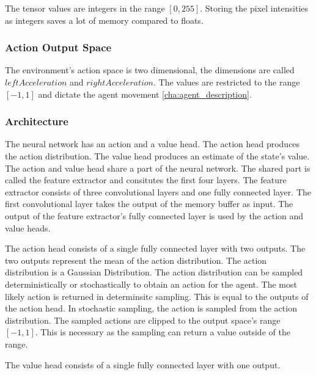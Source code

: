The tensor values are integers in the range $[0,255]$. Storing the pixel intensities as integers saves a lot of memory compared to floats.


\subsubsection{Action Output Space}

The environment's action space is two dimensional, the dimensions are called $leftAcceleration$ and $rightAcceleration$. The values are restricted to the range $[-1,1]$ and dictate the agent movement \ref*{cha:agent_description}.

\subsubsection{Architecture}
\label{sec:network_architecture}

The neural network has an action and a value head. The action head produces the action distribution. The value head produces an estimate of the state's value. The action and value head share a part of the neural network. The shared part is called the feature extractor and consitutes the first four layers. The feature extractor consists of three convolutional layers and one fully connected layer. The first convolutional layer takes the output of the memory buffer as input. The output of the feature extractor's fully connected layer is used by the action and value heads.

The action head consists of a single fully connected layer with two outputs. The two outputs represent the mean of the action distribution. The action distribution is a Gaussian Distribution. The action distribution can be sampled deterministically or stochastically to obtain an action for the agent. The most likely action is returned in determinsitc sampling. This is equal to the outputs of the action head. In stochastic sampling, the action is sampled from the action distribution.
The sampled actions are clipped to the output space's range $[-1,1]$. This is necessary as the sampling can return a value outside of the range.

The value head consists of a single fully connected layer with one output.


